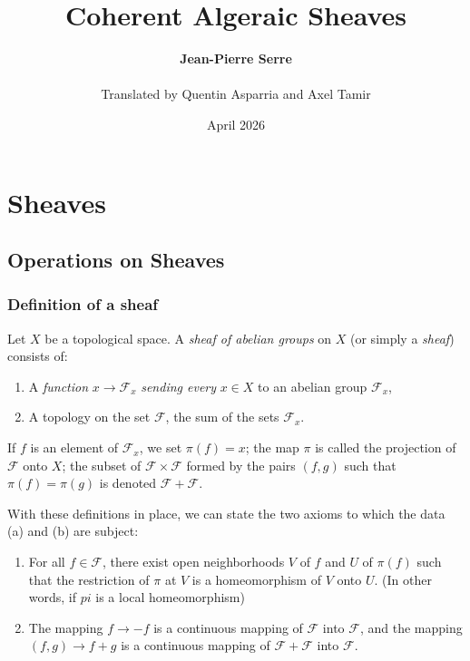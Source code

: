 \documentclass{book}
\title{Coherent Algeraic Sheaves}
\author{\textbf{Jean-Pierre Serre} \\ \\  Translated by Quentin Asparria and Axel Tamir}
\date{April 2026}
\begin{document}
\maketitle

\tableofcontents

\chapter{Sheaves}

\section{Operations on Sheaves}

\subsection{Definition of a sheaf}

\par Let $X$ be a topological space. A \textit{sheaf of abelian groups} on $X$ (or simply a \textit{sheaf}) consists of:

\begin{enumerate}[label = (\alph*)]
	\item A \textit{function} $x \rightarrow \mathcal{F}_x$ \textit{sending every} $x \in X$ to an abelian group $\mathcal{F}_x$, 
	\item A topology on the set $\mathcal{F}$, the sum of the sets $\mathcal{F}_x$. 
\end{enumerate}

If $f$ is an element of $\mathcal{F}_x$, we set $\pi (f) = x$; the map $\pi$ is called the projection of $\mathcal F$ onto $X$; the subset of $\mathcal F \times \mathcal F$ formed by the pairs $(f,g)$ such that $\pi(f) = \pi(g)$ is denoted $\mathcal F + \mathcal F$. 

With these definitions in place, we can state the two axioms to which the data (a) and (b)  are subject:
\begin{enumerate}[label=(\Roman*)]

\item For all $f \in \mathcal F$, there exist open neighborhoods $V$ of $f$ and $U$ of $\pi(f)$ such that the restriction of $\pi$ at $V$ is a homeomorphism of $V$ onto $U$.
	(In other words, if $pi$ is a local homeomorphism)
\item The mapping $f \rightarrow -f$ is a continuous mapping of $\mathcal F$ into $\mathcal F$, and the mapping $(f,g) \rightarrow f + g$ is a continuous mapping of $\mathcal F + \mathcal F$ into $\mathcal F$. 

\end{enumerate}
\end{document}
